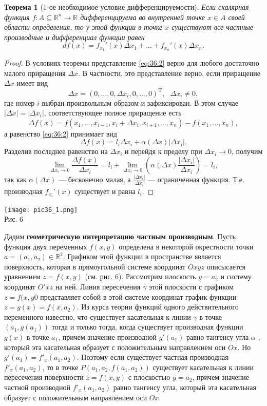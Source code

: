\documentclass[12pt]{report}
\numberwithin{equation}{section}
\newtheorem{theorem}{Теорема}[section]
\begin{document}
\begin{theorem}[1-ое необходимое условие дифференцируемости] \label{th:36:1}
Если скалярная функция $f : A \subseteq \mathbb{R}^n \to \mathbb{R}$ дифференцируема во внутренней точке $x \in A$ своей области определения, то у этой функции в точке $x$ существуют все частные производные и дифференциал функции равен
\[ df(x) = f_{x_1}'(x) \Delta x_1 + \dots + f_{x_n}'(x) \Delta x_n.\]
\end{theorem}
\begin{proof}
В условиях теоремы представление \eqref{eq:36:2} верно для любого достаточно малого приращения $\Delta x$. В частности, это представление верно, если приращение $\Delta x$ имеет вид
\[ \Delta x = (0, \ldots, 0, \Delta x_i, 0, \ldots, 0)^{\mathrm{T}},~~~\Delta x_i \neq 0,\]
где номер $i$ выбран произвольным образом и зафиксирован. В этом случае $|\Delta x| = |\Delta x_i|$, соответствующее полное приращение есть
\[ \Delta f(x) = f(x_1, \ldots, x_{i-1}, x_i + \Delta x_i, x_{i + 1}, \ldots, x_n) - f(x_1, \ldots, x_n),\]
а равенство \eqref{eq:36:2} принимает вид
\[ \Delta f(x) = l_i \Delta x_i + \alpha (\Delta x) |\Delta x_i|.\]
Разделив последнее равенство на $\Delta x_i$ и перейдя к пределу при $\Delta x_i \to 0$, получим
\[ \lim_{\Delta x_i \to 0} \frac{\Delta f(x)}{\Delta x_i} = l_i + \lim_{\Delta x_i \to 0} \left( \alpha(\Delta x) \frac{|\Delta x_i|}{\Delta x_i} \right) = l_i,\]
так как $\alpha(\Delta x)$ --- бесконечно малая, а $\frac{|\Delta x_i|}{\Delta x_i}$ --- ограниченная функция. Т.е. производная $f_{x_i}'(x)$ существует и равна $l_i$.
\end{proof}
\begin{center}
\texttt{[image: pic36\_1.png]}\\ \label{pic:36:1}
Рис. 6
\end{center}

Дадим \textbf{геометрическую интерпретацию частным производным}. Пусть функция двух переменных $f(x,y)$ определена в некоторой окрестности точки $a = (a_1, a_2) \in \mathbb{R}^2$. Графиком этой функции в пространстве является поверхность, которая в прямоугольной системе координат $Oxyz$ описысается уравнением $z = f(x,y)$ (см. \hyperref[pic:36:1]{рис. 6}). Рассмотрим плоскость $y = a_2$ и систему координат $O'xz$ на ней. Линия пересечения $\gamma$ этой плоскости с графиком $z = f(x,y0$ представляет собой в этой системе координат график функции $z = g(x) = f(x,a_2)$. Из курса теории функций одного действительного переменного известно, что существует касательная к линии $\gamma$ в точке $(a_1, g(a_1))$ тогда и только тогда, когда существует производная функции $g(x)$ в точке $a_1$, причем значение производной $g'(a_1)$ равно тангенсу угла $\alpha$ , который эта касательная образует с положительным направлением оси $Ox$. Но $g'(a_1) = f'_x(a_1, a_2)$. Поэтому если существует частная производная $f'_x(a_1, a_2)$, то в точке $P(a_1, a_2, f(a_1, a_2))$ существует касательная к линии пересечения поверхности $z = f(x,y)$ с плоскостью $y = a_2$, причем значение частной производной $f'_x(a_1, a_2)$ равно тангенсу угла, который эта касательная образует с положительным направлением оси $Ox$.\\
\end{document}
